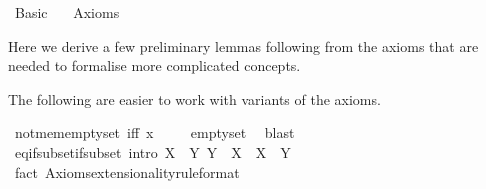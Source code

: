 %
\begin{isabellebody}%
%
%
\isadelimdocument
%
\endisadelimdocument
%
\isatagdocument
%
\isamarkuptrue%
%
\endisatagdocument
{\isafolddocument}%
%
\isadelimdocument
%
\endisadelimdocument
%
\isadelimtheory
%
\endisadelimtheory
%
\isatagtheory
{}\isamarkupfalse%
\ Basic\isanewline
\ \ \ Axioms\isanewline
{}%
\endisatagtheory
{\isafoldtheory}%
%
\isadelimtheory
%
\endisadelimtheory
%
\isadelimdocument
%
\endisadelimdocument
%
\isatagdocument
%
\isamarkuptrue%
%
\endisatagdocument
{\isafolddocument}%
%
\isadelimdocument
%
\endisadelimdocument
%
\begin{isamarkuptext}%
Here we derive a few preliminary lemmas following from the axioms that are
needed to formalise more complicated concepts.%
\end{isamarkuptext}\isamarkuptrue%
%
\begin{isamarkuptext}%
The following are easier to work with variants of the axioms.%
\end{isamarkuptext}\isamarkuptrue%
\isamarkupfalse%
\ not{\isacharunderscore}{\kern0pt}mem{\isacharunderscore}{\kern0pt}emptyset\ {\isacharbrackleft}{\kern0pt}iff{\isacharbrackright}{\kern0pt}{\isacharcolon}{\kern0pt}\ {\isachardoublequoteopen}x\ {\isasymnotin}\ {\isacharbraceleft}{\kern0pt}{\isacharbraceright}{\kern0pt}{\isachardoublequoteclose}%
\isadelimproof
\ %
\endisadelimproof
%
\isatagproof
{}\isamarkupfalse%
\ emptyset\ \isamarkupfalse%
\ blast%
\endisatagproof
{\isafoldproof}%
%
\isadelimproof
%
\endisadelimproof
\isanewline
\isanewline
{}\isamarkupfalse%
\ eq{\isacharunderscore}{\kern0pt}if{\isacharunderscore}{\kern0pt}subset{\isacharunderscore}{\kern0pt}if{\isacharunderscore}{\kern0pt}subset\ {\isacharbrackleft}{\kern0pt}intro{\isacharbrackright}{\kern0pt}{\isacharcolon}{\kern0pt}\ {\isachardoublequoteopen}{\isasymlbrakk}X\ {\isasymsubseteq}\ Y{\isacharsemicolon}{\kern0pt}\ Y\ {\isasymsubseteq}\ X{\isasymrbrakk}\ {\isasymLongrightarrow}\ X\ {\isacharequal}{\kern0pt}\ Y{\isachardoublequoteclose}\isanewline
%
\isadelimproof
\ \ %
\endisadelimproof
%
\isatagproof
{}\isamarkupfalse%
\ {\isacharparenleft}{\kern0pt}fact\ Axioms{\isachardot}{\kern0pt}extensionality{\isacharbrackleft}{\kern0pt}rule{\isacharunderscore}{\kern0pt}format{\isacharbrackright}{\kern0pt}{\isacharparenright}{\kern0pt}%
\endisatagproof
{\isafoldproof}%
%
\isadelimproof

\end{isabellebody}
